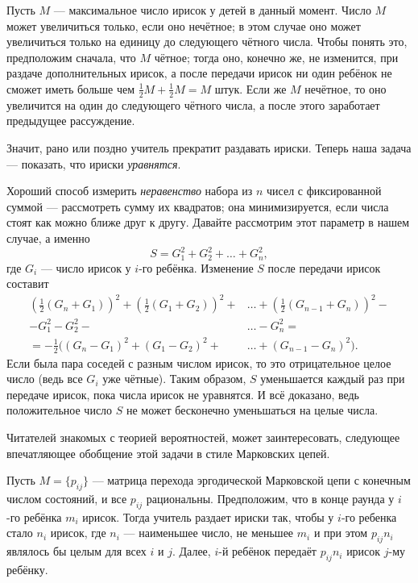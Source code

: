 Пусть $M$ --- максимальное число ирисок у детей в данный момент.
Число $M$ может увеличиться только, если оно нечётное;
в этом случае оно может увеличиться только на единицу до следующего чётного числа.
Чтобы понять это, предположим сначала, что $M$ чётное; тогда оно, конечно же, не изменится, при раздаче дополнительных ирисок, а после передачи ирисок ни один ребёнок не сможет иметь больше чем $\tfrac12 M + \tfrac12 M = M$ штук.
Если же $M$ нечётное, то оно увеличится на один до следующего чётного числа, а после этого заработает предыдущее рассуждение.

Значит, рано или поздно учитель прекратит раздавать ириски.
Теперь наша задача --- показать, что ириски \emph{уравнятся}.

Хороший способ измерить \emph{неравенство} набора из $n$ чисел с фиксированной суммой --- рассмотреть сумму их квадратов; она минимизируется, если числа стоят как можно ближе друг к другу.
Давайте рассмотрим этот параметр в нашем случае, а именно 
\[S = G^2_1 + G^2_2 + \dots + G^2_n,\]
где $G_i$ --- число ирисок у $i$-го ребёнка.
Изменение $S$ после передачи ирисок составит
\begin{align*}
\left(\tfrac{1}{2}(G_n+G_1)\right)^2+\left(\tfrac{1}{2}(G_1+G_2)\right)^2+&\dots+\left(\tfrac{1}{2}(G_{n-1}+G_n)\right)^2-
\\
-G_1^2-G_2^2-&\dots-G_n^2=
\\
=-\tfrac12\bigl((G_n-G_1)^2+(G_1-G_2)^2+&\dots+(G_{n-1}-G_n)^2\bigr).
\end{align*}
Если была пара соседей с разным числом ирисок, то это отрицательное целое число (ведь все $G_i$ уже чётные).
Таким образом, $S$ уменьшается каждый раз при передаче ирисок, пока числа ирисок не уравнятся.
И всё доказано, ведь положительное число $S$ не может бесконечно уменьшаться на целые числа.

\medskip

Читателей знакомых с теорией вероятностей, может заинтересовать, следующее впечатляющее обобщение этой задачи в стиле Марковских цепей.

Пусть $M=\{p_{ij}\}$ --- матрица перехода эргодической Марковской цепи с конечным числом состояний, и все $p_{ij}$ рациональны.
Предположим, что в конце раунда у $i$-го ребёнка $m_i$ ирисок.
Тогда учитель раздает ириски так, чтобы у $i$-го ребенка стало $n_i$ ирисок, где $n_i$ --- наименьшее число, не меньшее  $m_i$ и при этом $p_{ij}n_i$ являлось бы целым для всех $i$ и $j$.
Далее, $i$-й ребёнок передаёт $p_{ij}n_i$ ирисок $j$-му ребёнку.

